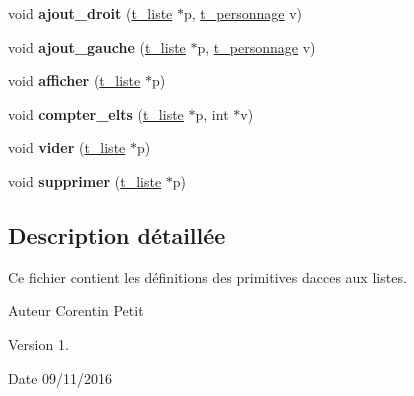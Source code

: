 \begin{DoxyCompactItemize}
\item 
void {\bfseries ajout\+\_\+droit} (\hyperlink{a00007}{t\+\_\+liste} $\ast$p, \hyperlink{a00010}{t\+\_\+personnage} v)\hypertarget{a00025_af63f749e5d177cf431f219915e24a76d}{}\label{a00025_af63f749e5d177cf431f219915e24a76d}

\item 
void {\bfseries ajout\+\_\+gauche} (\hyperlink{a00007}{t\+\_\+liste} $\ast$p, \hyperlink{a00010}{t\+\_\+personnage} v)\hypertarget{a00025_a3c18a559a8adbe1dd9e9bcd49c680c6b}{}\label{a00025_a3c18a559a8adbe1dd9e9bcd49c680c6b}

\item 
void {\bfseries afficher} (\hyperlink{a00007}{t\+\_\+liste} $\ast$p)\hypertarget{a00025_a066b4e6b2b8afb789416a06cf18d52b8}{}\label{a00025_a066b4e6b2b8afb789416a06cf18d52b8}

\item 
void {\bfseries compter\+\_\+elts} (\hyperlink{a00007}{t\+\_\+liste} $\ast$p, int $\ast$v)\hypertarget{a00025_acea998490ff91e660d2f7d7530a020b7}{}\label{a00025_acea998490ff91e660d2f7d7530a020b7}

\item 
void {\bfseries vider} (\hyperlink{a00007}{t\+\_\+liste} $\ast$p)\hypertarget{a00025_a7ecbb44530688750d47fa00a96d6add8}{}\label{a00025_a7ecbb44530688750d47fa00a96d6add8}

\item 
void {\bfseries supprimer} (\hyperlink{a00007}{t\+\_\+liste} $\ast$p)\hypertarget{a00025_aab08b37ee056b9411e2265637fb3af1c}{}\label{a00025_aab08b37ee056b9411e2265637fb3af1c}

\end{DoxyCompactItemize}


\subsection{Description détaillée}
Ce fichier contient les définitions des primitives d\textquotesingle{}acces aux listes. 

\begin{DoxyAuthor}{Auteur}
Corentin Petit 
\end{DoxyAuthor}
\begin{DoxyVersion}{Version}
1. 
\end{DoxyVersion}
\begin{DoxyDate}{Date}
09/11/2016 
\end{DoxyDate}
